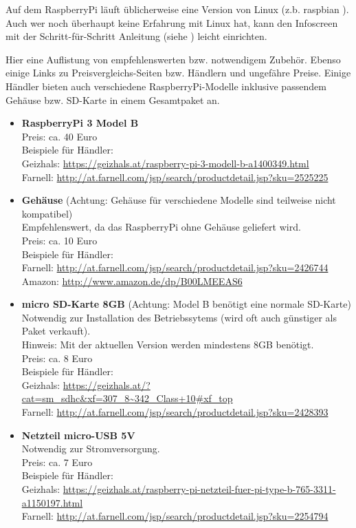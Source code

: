 \clearpage

Auf dem RaspberryPi läuft üblicherweise eine Version von Linux (z.b. raspbian \cite{raspbian}).
Auch wer noch überhaupt keine Erfahrung mit Linux hat, kann den Infoscreen mit der Schritt-für-Schritt Anleitung (siehe ) leicht einrichten.


Hier eine Auflistung von empfehlenswerten bzw. notwendigem Zubehör. Ebenso einige Links zu Preisvergleichs-Seiten bzw. Händlern und ungefähre Preise.
Einige Händler bieten auch verschiedene RaspberryPi-Modelle inklusive passendem Gehäuse bzw. SD-Karte in einem Gesamtpaket an.
\begin{itemize}
	\item \textbf{RaspberryPi 3 Model B}\\
		Preis: ca. 40 Euro\\
		Beispiele für Händler:\\
		Geizhals: \url{https://geizhals.at/raspberry-pi-3-modell-b-a1400349.html}\\
		Farnell: \url{http://at.farnell.com/jsp/search/productdetail.jsp?sku=2525225}
	\item \textbf{Gehäuse} (Achtung: Gehäuse für verschiedene Modelle sind teilweise nicht kompatibel)\\
		Empfehlenswert, da das RaspberryPi ohne Gehäuse geliefert wird.\\
		Preis: ca. 10 Euro\\
		Beispiele für Händler:\\
		Farnell: \url{http://at.farnell.com/jsp/search/productdetail.jsp?sku=2426744}\\
		Amazon: \url{http://www.amazon.de/dp/B00LMEEAS6}
	\item \textbf{micro SD-Karte 8GB} (Achtung: Model B benötigt eine normale SD-Karte)\\
		Notwendig zur Installation des Betriebssytems (wird oft auch günstiger als Paket verkauft).\\
		Hinweis: Mit der aktuellen Version werden mindestens 8GB benötigt.\\
		Preis: ca. 8 Euro\\
		Beispiele für Händler:\\
		Geizhals: \url{https://geizhals.at/?cat=sm_sdhc&xf=307_8~342_Class+10#xf_top}\\
		Farnell: \url{http://at.farnell.com/jsp/search/productdetail.jsp?sku=2428393}
	\item \textbf{Netzteil micro-USB 5V}\\
		Notwendig zur Stromversorgung.\\
		Preis: ca. 7 Euro\\
		Beispiele für Händler:\\
		Geizhals: \url{https://geizhals.at/raspberry-pi-netzteil-fuer-pi-type-b-765-3311-a1150197.html}\\
		Farnell: \url{http://at.farnell.com/jsp/search/productdetail.jsp?sku=2254794}
\end{itemize}


